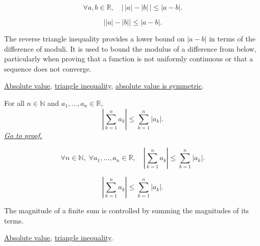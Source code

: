 \begin{remark*}
\[
  \forall a, b \in \mathbb{R},\quad
  \lvert\, \lvert a \rvert - \lvert b \rvert \,\rvert
  \le \lvert a - b \rvert.
\]
\end{remark*}

\begin{remark*}
\[
\bigl||a|-|b|\bigr|\le |a-b|.
\]
\end{remark*}

\begin{remark*}[Interpretation]
The reverse triangle inequality provides a lower bound on $\lvert a - b
\rvert$ in terms of the difference of moduli.  It is used to bound the
modulus of a difference from below, particularly when proving that a
function is not uniformly continuous or that a sequence does not converge.
\end{remark*}

\begin{dependencies}
\hyperref[def:absolute-value]{Absolute value},
\hyperref[thm:triangle-inequality]{triangle inequality},
\hyperref[thm:absolute-value-symmetric]{absolute value is symmetric}.
\end{dependencies}


\begin{theorem}
\label{thm:absolute-value-sum-bound}
For all $n \in \mathbb{N}$ and $a_1, \ldots, a_n \in \mathbb{R}$,
\[
  \left\lvert \sum_{k=1}^{n} a_k \right\rvert
  \le \sum_{k=1}^{n} \lvert a_k \rvert.
\]
\hyperref[prf:absolute-value-sum-bound]{\textit{Go to proof.}}
\end{theorem}



\begin{remark*}
\[
  \forall n \in \mathbb{N},\;
  \forall a_1, \ldots, a_n \in \mathbb{R},\quad
  \left\lvert \sum_{k=1}^{n} a_k \right\rvert
  \le \sum_{k=1}^{n} \lvert a_k \rvert.
\]
\end{remark*}

\begin{remark*}
\[
\left|\sum_{k=1}^n a_k\right|\le \sum_{k=1}^n |a_k|.
\]
\end{remark*}

\begin{remark*}[Interpretation]
The magnitude of a finite sum is controlled by summing the magnitudes of its terms.
\end{remark*}

\begin{dependencies}
\hyperref[def:absolute-value]{Absolute value},
\hyperref[thm:triangle-inequality]{triangle inequality}.
\end{dependencies}
